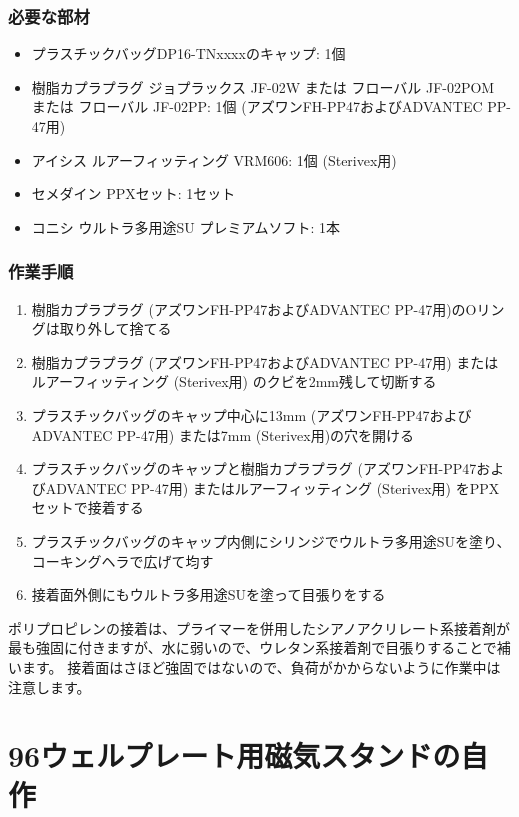 \documentclass[titlepage,10pt,a4paper,uplatex]{jsbook}
\begin{document}
\subsubsection{必要な部材}
\begin{itemize}
\item プラスチックバッグDP16-TNxxxxのキャップ: 1個
\item 樹脂カプラプラグ ジョプラックス JF-02W または フローバル JF-02POM または フローバル JF-02PP: 1個 (アズワンFH-PP47およびADVANTEC PP-47用)
\item アイシス ルアーフィッティング VRM606: 1個 (Sterivex用)
\item セメダイン PPXセット: 1セット
\item コニシ ウルトラ多用途SU プレミアムソフト: 1本
\end{itemize}

\subsubsection{作業手順}
\begin{enumerate}
\item 樹脂カプラプラグ (アズワンFH-PP47およびADVANTEC PP-47用)のOリングは取り外して捨てる
\item 樹脂カプラプラグ (アズワンFH-PP47およびADVANTEC PP-47用) またはルアーフィッティング (Sterivex用) のクビを2mm残して切断する
\item プラスチックバッグのキャップ中心に13mm (アズワンFH-PP47およびADVANTEC PP-47用) または7mm (Sterivex用)の穴を開ける
\item プラスチックバッグのキャップと樹脂カプラプラグ (アズワンFH-PP47およびADVANTEC PP-47用) またはルアーフィッティング (Sterivex用) をPPXセットで接着する
\item プラスチックバッグのキャップ内側にシリンジでウルトラ多用途SUを塗り、コーキングヘラで広げて均す
\item 接着面外側にもウルトラ多用途SUを塗って目張りをする
\end{enumerate}

ポリプロピレンの接着は、プライマーを併用したシアノアクリレート系接着剤が最も強固に付きますが、水に弱いので、ウレタン系接着剤で目張りすることで補います。
接着面はさほど強固ではないので、負荷がかからないように作業中は注意します。

\section{96ウェルプレート用磁気スタンドの自作}\label{makingmagnetstand}
\end{document}
